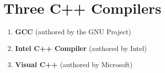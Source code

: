 \documentclass{article}
\begin{document}
 \section*{Three C++ Compilers}
 \begin{enumerate}
  \item \textbf{GCC} (authored by the GNU Project)
  \item \textbf{Intel C++ Compiler} (authored by Intel)
  \item \textbf{Visual C++} (authored by Microsoft)
 \end{enumerate}
\end{document}
